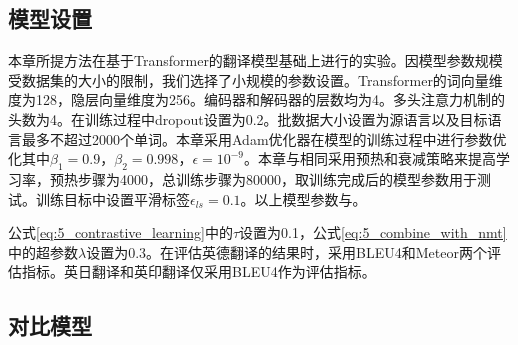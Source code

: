 \subsection{模型设置}
\label{sec:5_model_setup}

本章所提方法在基于Transformer的翻译模型基础上进行的实验。因模型参数规模受数据集的大小的限制，我们选择了小规模的参数设置。Transformer的词向量维度为128，隐层向量维度为256。编码器和解码器的层数均为4。多头注意力机制的头数为4。在训练过程中dropout设置为0.2。批数据大小设置为源语言以及目标语言最多不超过2000个单词。本章采用Adam优化器在模型的训练过程中进行参数优化其中$\beta_1=0.9$，$\beta_2=0.998$，$\epsilon=10^{-9}$。本章与相同采用预热和衰减策略来提高学习率，预热步骤为4000，总训练步骤为80000，取训练完成后的模型参数用于测试。训练目标中设置平滑标签$\epsilon_{ls}=0.1$。以上模型参数与。

公式\ref{eq:5_contrastive_learning}中的$\tau$设置为0.1，公式\ref{eq:5_combine_with_nmt}中的超参数$\lambda$设置为0.3。在评估英德翻译的结果时，采用BLEU4和Meteor两个评估指标。英日翻译和英印翻译仅采用BLEU4作为评估指标。

\subsection{对比模型}

